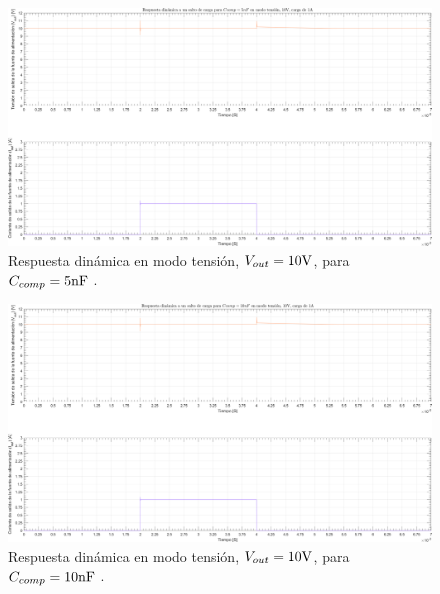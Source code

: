 \clearpage

\begin{figure}[H] %
\begin{center}
\includegraphics[width=1.1 \textwidth, angle=90]{./img/plots/dynamic/power_supply_CCOMP_5n_STEP_Modo1.png}
\caption{\label{fig:fig_power_supply_CCOMP_STEP_5n_Modo1}\footnotesize{Respuesta dinámica en modo tensión, $V_{out} = 10 \si[per-mode=symbol]{\volt}$, para $C_{comp} = 5 \si[per-mode=symbol]{\nano\farad} $ .}}
\end{center}
\end{figure}

\clearpage

\begin{figure}[H] %
\begin{center}
\includegraphics[width=1.1 \textwidth, angle=90]{./img/plots/dynamic/power_supply_CCOMP_10n_STEP_Modo1.png}
\caption{\label{fig:fig_power_supply_CCOMP_STEP_10n_Modo1}\footnotesize{Respuesta dinámica en modo tensión, $V_{out} = 10 \si[per-mode=symbol]{\volt}$, para $C_{comp} = 10 \si[per-mode=symbol]{\nano\farad} $ .}}
\end{center}
\end{figure}

